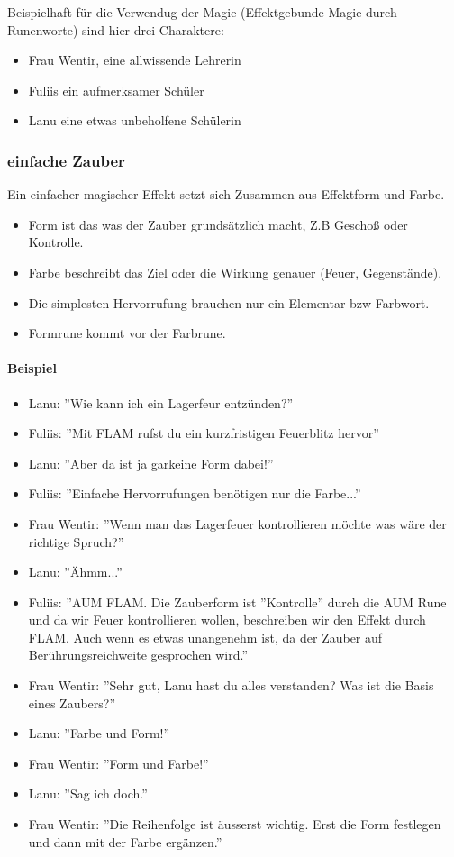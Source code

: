 \documentclass{article}
\begin{document}
Beispielhaft für die Verwendug der Magie (Effektgebunde Magie durch Runenworte) sind hier drei Charaktere:
\begin{itemize}
\item Frau Wentir,  eine allwissende Lehrerin
\item Fuliis ein aufmerksamer Schüler
\item Lanu eine etwas unbeholfene Schülerin
\end{itemize}

\subsubsection{einfache Zauber}

Ein einfacher magischer Effekt setzt sich Zusammen aus Effektform und Farbe.

\begin{itemize}
\item Form ist das was der Zauber grundsätzlich macht, Z.B Geschoß oder Kontrolle.
\item Farbe beschreibt das Ziel oder die Wirkung genauer (Feuer, Gegenstände).
\item Die simplesten Hervorrufung brauchen nur ein Elementar bzw Farbwort.
\item Formrune kommt vor der Farbrune.
\end{itemize}

\paragraph{Beispiel}

\begin{itemize}
\item Lanu: ''Wie kann ich ein Lagerfeur entzünden?''
\item Fuliis: ''Mit FLAM rufst du ein kurzfristigen Feuerblitz hervor''
\item Lanu: ''Aber da ist ja garkeine Form dabei!''
\item Fuliis: ''Einfache Hervorrufungen benötigen nur die Farbe...''
\item Frau Wentir: ''Wenn man das Lagerfeuer kontrollieren möchte was wäre der richtige Spruch?''
\item Lanu: ''Ähmm...''
\item Fuliis: ''AUM FLAM. Die Zauberform ist ''Kontrolle'' durch die AUM Rune und da wir Feuer kontrollieren wollen, beschreiben wir den Effekt durch FLAM. Auch wenn es etwas unangenehm ist, da der Zauber auf Berührungsreichweite gesprochen wird.''
\item Frau Wentir: ''Sehr gut, Lanu hast du alles verstanden? Was ist die Basis eines Zaubers?''
\item Lanu: ''Farbe und Form!''
\item Frau Wentir: ''Form und Farbe!''
\item Lanu: ''Sag ich doch.''
\item Frau Wentir: ''Die Reihenfolge ist äusserst wichtig. Erst die Form festlegen und dann mit der Farbe ergänzen.''
\end{itemize}
\end{document}
